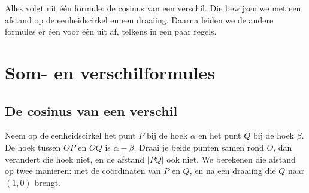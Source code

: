 Alles volgt uit één formule: de cosinus van een verschil. Die bewijzen we met een afstand op de eenheidscirkel en een draaiing. Daarna leiden we de andere formules er één voor één uit af, telkens in een paar regels.

\begin{oefeningen}[Start]

\end{oefeningen}

\section{Som- en verschilformules}

\subsection{De cosinus van een verschil}

Neem op de eenheidscirkel het punt $P$ bij de hoek $\alpha$ en het punt $Q$ bij de hoek $\beta$. De hoek tussen $OP$ en $OQ$ is $\alpha - \beta$. Draai je beide punten samen rond $O$, dan verandert die hoek niet, en de afstand $|PQ|$ ook niet. We berekenen die afstand op twee manieren: met de coördinaten van $P$ en $Q$, en na een draaiing die $Q$ naar $(1, 0)$ brengt.

